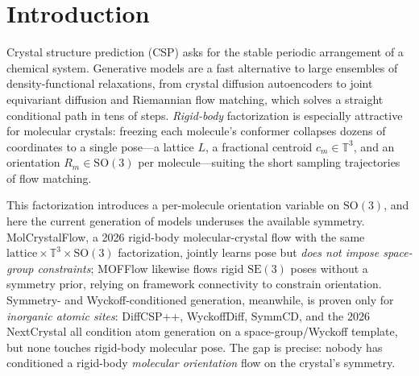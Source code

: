\documentclass{article}
\begin{document}
\section{Introduction}
Crystal structure prediction (CSP) asks for the stable periodic arrangement of a
chemical system. Generative models are a fast alternative to large ensembles of
density-functional relaxations, from crystal diffusion
autoencoders\cite{xie2022cdvae} to joint equivariant
diffusion\cite{jiao2023diffcsp} and Riemannian flow
matching\cite{miller2024flowmm,lipman2023flowmatching,chen2024riemannian}, which
solves a straight conditional path in tens of steps. \emph{Rigid-body}
factorization is especially attractive for molecular crystals: freezing each
molecule's conformer collapses dozens of coordinates to a single pose---a lattice
$L$, a fractional centroid $c_m\in\mathbb{T}^3$, and an orientation
$R_m\in\mathrm{SO}(3)$ per molecule---suiting the short sampling trajectories of
flow matching.

This factorization introduces a per-molecule orientation variable on $\mathrm{SO}(3)$, and here
the current generation of models underuses the available symmetry. MolCrystalFlow, a
2026 rigid-body molecular-crystal flow with the same
$\text{lattice}\times\mathbb{T}^3\times\mathrm{SO}(3)$ factorization, jointly
learns pose but \emph{does not impose space-group
constraints}\cite{zeng2026molcrystalflow}; MOFFlow likewise flows rigid
$\mathrm{SE}(3)$ poses without a symmetry prior, relying on framework
connectivity to constrain orientation\cite{kim2025mofflow}. Symmetry- and
Wyckoff-conditioned generation, meanwhile, is proven only for
\emph{inorganic atomic sites}: DiffCSP++\cite{jiao2024diffcsppp},
WyckoffDiff\cite{wyckoffdiff2025}, SymmCD\cite{symmcd2025}, and the 2026
NextCrystal\cite{mu2026nextcrystal} all condition atom generation on a
space-group/Wyckoff template, but none touches rigid-body molecular pose. The
gap is precise: nobody has conditioned a rigid-body \emph{molecular orientation}
flow on the crystal's symmetry.
\end{document}
